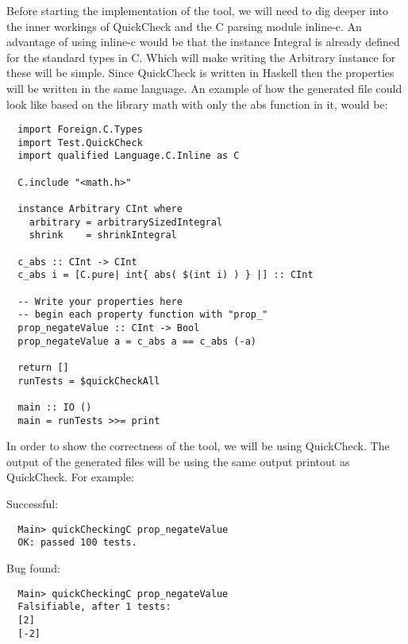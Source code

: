 Before starting the implementation of the tool, we will need to dig deeper into the inner workings of QuickCheck and the C parsing module inline-c.
An advantage of using inline-c would be that the instance Integral is already defined for the standard types in C.
Which will make writing the Arbitrary instance for these will be simple.
Since QuickCheck is written in Haskell then the properties will be written in the same language.
An example of how the generated file could look like based on the library math with only the abs function in it, would be:

\begin{verbatim}
  import Foreign.C.Types
  import Test.QuickCheck
  import qualified Language.C.Inline as C
    
  C.include "<math.h>"

  instance Arbitrary CInt where
    arbitrary = arbitrarySizedIntegral
    shrink    = shrinkIntegral

  c_abs :: CInt -> CInt
  c_abs i = [C.pure| int{ abs( $(int i) ) } |] :: CInt
    
  -- Write your properties here
  -- begin each property function with "prop_"
  prop_negateValue :: CInt -> Bool
  prop_negateValue a = c_abs a == c_abs (-a)

  return []
  runTests = $quickCheckAll

  main :: IO ()
  main = runTests >>= print
\end{verbatim}

In order to show the correctness of the tool, we will be using QuickCheck.
The output of the generated files will be using the same output printout as QuickCheck.
For example:

Successful:

\begin{verbatim}
  Main> quickCheckingC prop_negateValue
  OK: passed 100 tests.
\end{verbatim}

Bug found:

\begin{verbatim}
  Main> quickCheckingC prop_negateValue
  Falsifiable, after 1 tests:
  [2]
  [-2]
\end{verbatim}

